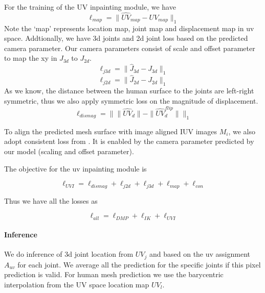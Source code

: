 \documentclass[10pt,twocolumn,letterpaper]{article}
\begin{document}
For the training of the UV inpainting module, we have 
\begin{equation}
{\ell_{map}} = \| {\hat {UV}_{map}} - UV_{map} \|_{1}
  \label{eqn:map}
\end{equation}
Note the `map' represents  location map,  joint map and  displacement map in uv space. Addtionally, we have 3d joints and 2d joint loss based on the predicted camera parameter. Our camera parameters  consist of scale and offset parameter to map the xy in $J_{3d}$  to $J_{2d}$.
\begin{equation}
{\ell_{j3d}} = \| {\hat {J}_{3d}} - J_{3d} \|_{1}
  \label{eqn:j3d}
\end{equation}
\begin{equation}
{\ell_{j2d}} = \| {\hat {J}_{2d}} - J_{2d} \|_{1}
  \label{eqn:j2d}
\end{equation}
As we know, the distance between the human surface to the joints are left-right symmetric, thus we also apply symmetric loss on the magnitude of displacement.
\begin{equation}
{\ell_{dismag}} = \|  \|{\hat {UV}_{d}}\| - \|{\hat {UV}^{flip}_{d}}\| \|_{1}
  \label{eqn:displacementmagnitude}
\end{equation}

To align the predicted mesh surface with image aligned IUV images $M_i$, we also adopt consistent loss from \cite{decomr}. It is enabled by the camera parameter predicted by our model (scaling and offset parameter). 

The objective for the uv inpainting module is 

\begin{equation}
{\ell_{UVI}} = {\ell_{dismag}} + {\ell_{j2d}} + {\ell_{j3d}} + {\ell_{map}}  + {\ell_{con}}
  \label{eqn:UVI}
\end{equation}


Thus we have all the losses as 

\begin{equation}
{\ell_{all}} = {\ell_{DMP}} + {\ell_{IK}} + {\ell_{UVI}}
  \label{eqn:allloss}
\end{equation}

\paragraph{Inference} We do inference of 3d joint location from  $UV_j$ and based on the uv assignment $A_{uv}$ for each joint. We average all the prediction for the specific joints if this pixel prediction is valid. For human mesh prediction we use the barycentric interpolation from the UV space location map $UV_l$.
\end{document}
